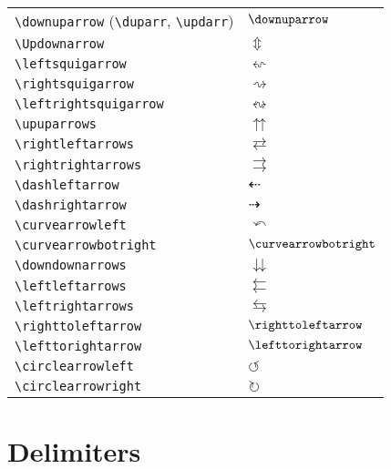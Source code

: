 \documentclass[text,xhtml,itex]{internet}
\begin{document}
\begin{tabular}{ll}
\verb+\downuparrow+ (\verb+\duparr+, \verb+\updarr+)   & \(\downuparrow\)\\
\verb+\Updownarrow+                          & \(\Updownarrow\)\\
\verb+\leftsquigarrow+                       & \(\leftsquigarrow\)\\
\verb+\rightsquigarrow+                      & \(\rightsquigarrow\)\\
\verb+\leftrightsquigarrow+                  & \(\leftrightsquigarrow\)\\
\verb+\upuparrows+                           & \(\upuparrows\)\\
\verb+\rightleftarrows+                      & \(\rightleftarrows\)\\
\verb+\rightrightarrows+                     & \(\rightrightarrows\)\\
\verb+\dashleftarrow+                        & \(\dashleftarrow\)\\
\verb+\dashrightarrow+                       & \(\dashrightarrow\)\\
\verb+\curvearrowleft+                       & \(\curvearrowleft\)\\
\verb+\curvearrowbotright+                   & \(\curvearrowbotright\)\\
\verb+\downdownarrows+                       & \(\downdownarrows\)\\
\verb+\leftleftarrows+                       & \(\leftleftarrows\)\\
\verb+\leftrightarrows+                      & \(\leftrightarrows\)\\
\verb+\righttoleftarrow+                     & \(\righttoleftarrow\)\\
\verb+\lefttorightarrow+                     & \(\lefttorightarrow\)\\
\verb+\circlearrowleft+                      & \(\circlearrowleft\)\\
\verb+\circlearrowright+                     & \(\circlearrowright\)
\end{tabular}

\section{Delimiters}
\end{document}
